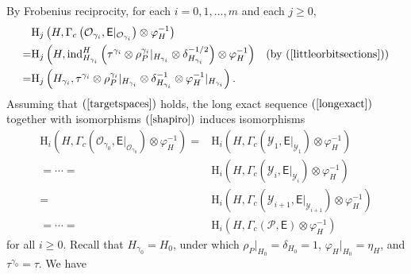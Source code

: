 \documentclass[12pt]{amsart}
\newcommand{\RH}{{\mathrm {H}}}
\theoremstyle{Theorem}
\theoremstyle{Theorem}
\theoremstyle{Theorem}
\theoremstyle{Theorem}
\theoremstyle{Plain}
\theoremstyle{remark}
\theoremstyle{remark}
\theoremstyle{Definition}
\begin{document}
By Frobenius reciprocity, for each $ i = 0, 1, \dots, m $ and each $ j \ge 0 $,
\begin{equation}
    \label{shapiro}
    \begin{aligned}
         & \RH_j
        \left(
            H, \Gamma_c \left( \mathcal{O}_{ \gamma_{i} }, \mathsf{E}|_{ \mathcal{O}_{ \gamma_{i} } } \right) \otimes \varphi_H^{-1} 
        \right)                                                                          \\ 
        =& \RH_j
        \left(
            H, \mathrm{ind}^H_{ H_{ \gamma_i } } \left( \tau^{ \gamma_i } \otimes \rho_P^{ \gamma_i }|_{ H_{ \gamma_i } } \otimes \delta_{ H_{ \gamma_i } }^{-1/2} \right) \otimes \varphi_H^{-1} \right) & ( \text{by } ( \ref{littleorbitsections} ) )\\
        =& \RH_j
        \left(
            H_{ \gamma_i }, \tau^{ \gamma_i } \otimes \rho_P^{ \gamma_i }|_{ H_{ \gamma_i } } \otimes \delta_{ H_{ \gamma_i } }^{-1} \otimes \varphi_H^{-1}|_{ H_{ \gamma_i } }
        \right).
    \end{aligned}
\end{equation}
Assuming that $ ( \ref{targetspaces} ) $ holds, the long exact sequence $ ( \ref{longexact} ) $ together with isomorphisms $ ( \ref{shapiro} ) $ induces isomorphisms
\[
    \begin{aligned}
        \RH_i 
        \left(
            H, \Gamma_c \left( \mathcal{O}_{ \gamma_0 }, \mathsf{E}|_{ \mathcal{O}_{ \gamma_0 } } \right) \otimes \varphi_H^{-1}
        \right)
                 =& \RH_i
        \left(
            H, \Gamma_c \left( \mathcal{Y}_{1}, \mathsf{E}|_{ \mathcal{Y}_{1} } \right) \otimes \varphi_H^{-1}
        \right)\\
        = \cdots =& \RH_i
        \left(
            H, \Gamma_c \left( \mathcal{Y}_{i}, \mathsf{E}|_{ \mathcal{Y}_{i} } \right) \otimes \varphi_H^{-1}
        \right)\\
                 =& \RH_i
        \left(
            H, \Gamma_c \left( \mathcal{Y}_{i + 1}, \mathsf{E}|_{\mathcal{Y}_{i + 1} } \right) \otimes \varphi_H^{-1}
        \right)\\
        = \cdots =& \RH_i
        \left(
            H, \Gamma_c \left( \mathcal{P},\mathsf{E} \right) \otimes \varphi_H^{-1}
        \right)
    \end{aligned}
\]
for all $ i \ge 0 $. Recall that $ H_{ \gamma_0 } = H_0 $, under which $ \rho_P|_{H_0} = \delta_{H_0} = 1 $, $ \varphi_H|_{H_0} = \eta_H $, and $ \tau^{ \gamma_0 } = \tau $. We have 
\end{document}

